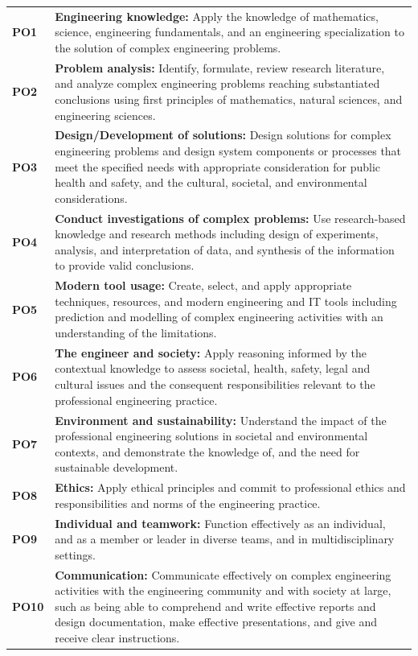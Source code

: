 \documentclass[12pt,a4paper]{article}
\begin{document}
\begin{tabular}{p{0.5cm} p{14cm}}
\textbf{PO1} & \textbf{Engineering knowledge:} Apply the knowledge of mathematics, science, engineering fundamentals, and an engineering specialization to the solution of complex engineering problems. \\
\textbf{PO2} & \textbf{Problem analysis:} Identify, formulate, review research literature, and analyze complex engineering problems reaching substantiated conclusions using first principles of mathematics, natural sciences, and engineering sciences. \\
\textbf{PO3} & \textbf{Design/Development of solutions:} Design solutions for complex engineering problems and design system components or processes that meet the specified needs with appropriate consideration for public health and safety, and the cultural, societal, and environmental considerations. \\
\textbf{PO4} & \textbf{Conduct investigations of complex problems:} Use research-based knowledge and research methods including design of experiments, analysis, and interpretation of data, and synthesis of the information to provide valid conclusions. \\
\textbf{PO5} & \textbf{Modern tool usage:} Create, select, and apply appropriate techniques, resources, and modern engineering and IT tools including prediction and modelling of complex engineering activities with an understanding of the limitations. \\
\textbf{PO6} & \textbf{The engineer and society:} Apply reasoning informed by the contextual knowledge to assess societal, health, safety, legal and cultural issues and the consequent responsibilities relevant to the professional engineering practice. \\
\textbf{PO7} & \textbf{Environment and sustainability:} Understand the impact of the professional engineering solutions in societal and environmental contexts, and demonstrate the knowledge of, and the need for sustainable development. \\
\textbf{PO8} & \textbf{Ethics:} Apply ethical principles and commit to professional ethics and responsibilities and norms of the engineering practice. \\
\textbf{PO9} & \textbf{Individual and teamwork:} Function effectively as an individual, and as a member or leader in diverse teams, and in multidisciplinary settings. \\
\textbf{PO10} & \textbf{Communication:} Communicate effectively on complex engineering activities with the engineering community and with society at large, such as being able to comprehend and write effective reports and design documentation, make effective presentations, and give and receive clear instructions. \\

\end{tabular}
\end{document}

